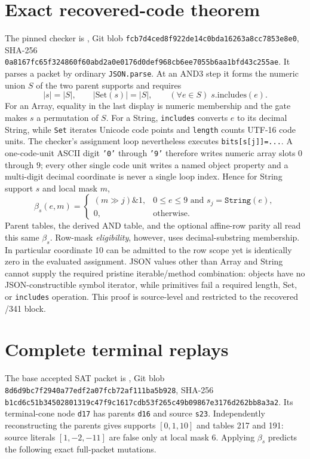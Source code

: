 \documentclass[11pt]{article}
\begin{document}
\section{Exact recovered-code theorem}
The pinned checker is , Git blob
\texttt{fcb7d4ced8f922de14c0bda16263a8cc7853e8e0}, SHA-256
\texttt{0a8167fc65f324860f60abd2a0e0176d0def968cb6ee7055b6aa1bfd43c255ae}.
It parses a packet by ordinary \texttt{JSON.parse}.  At an AND3 step it forms the numeric union $S$ of the two parent supports and requires
\[
 |s|=|S|,\qquad |\mathrm{Set}(s)|=|S|,\qquad (\forall e\in S)\;s.\mathrm{includes}(e).
\]
For an Array, equality in the last display is numeric membership and the gate makes $s$ a permutation of $S$.  For a String, \texttt{includes} converts $e$ to its decimal String, while \texttt{Set} iterates Unicode code points and \texttt{length} counts UTF-16 code units.  The checker's assignment loop nevertheless executes \texttt{bits[s[j]]=...}.  A one-code-unit ASCII digit \texttt{'0'} through \texttt{'9'} therefore writes numeric array slots $0$ through $9$; every other single code unit writes a named object property and a multi-digit decimal coordinate is never a single loop index.  Hence for String support $s$ and local mask $m$,
\[
 \beta_s(e,m)=
 \begin{cases}
 (m\mathbin{\gg}j)\mathbin{\&}1,&0\le e\le 9\text{ and }s_j=\texttt{String}(e),\\
 0,&\text{otherwise}.
 \end{cases}
\]
Parent tables, the derived AND table, and the optional affine-row parity all read this same $\beta_s$.  Row-mask \emph{eligibility}, however, uses decimal-substring membership.  In particular coordinate 10 can be admitted to the row scope yet is identically zero in the evaluated assignment.  JSON values other than Array and String cannot supply the required pristine iterable/method combination: objects have no JSON-constructible symbol iterator, while primitives fail a required length, Set, or \texttt{includes} operation.  This proof is source-level and restricted to the recovered /341 block.

\section{Complete terminal replays}
The base accepted SAT packet is , Git blob
\texttt{8d6d9bc7f2940a77edf2a07fcb72af111ba5b928}, SHA-256
\texttt{b1cd6c51b34502801319c47f9c1617cdb53f265c49b09867e3176d262bb8a3a2}.
Its terminal-cone node \texttt{d17} has parents \texttt{d16} and source \texttt{s23}.  Independently reconstructing the parents gives supports $[0,1,10]$ and tables 217 and 191: source literals $[1,-2,-11]$ are false only at local mask 6.  Applying $\beta_s$ predicts the following exact full-packet mutations.
\end{document}
